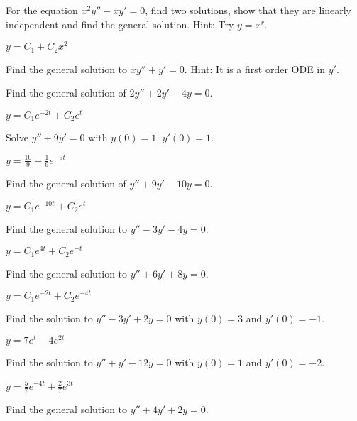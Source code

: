 \begin{exercise}
For the equation $x^2 y'' - x y' = 0$, find two solutions, show that they
are linearly independent and find the general solution.
Hint: Try $y = x^r$.
\end{exercise}
\comboSol{%
}
{%
$y = C_1 + C_2x^2$
}

\begin{exercise}\ansMark%
Find the general solution to
$x y'' + y' = 0$.  Hint: It is a first order ODE in $y'$.
\end{exercise}

\begin{exercise}
Find the general solution of $2y'' + 2y' -4 y = 0$.
\end{exercise}
\comboSol{%
}
{%
$y = C_1e^{-2t} + C_2e^{t}$
}

\begin{exercise}
Solve $y'' + 9y' = 0$ with $y(0) = 1$, $y'(0) = 1$.
\end{exercise}
\comboSol{%
}
{%
$y = \frac{10}{9} - \frac{1}{9}e^{-9t}$
}
\begin{exercise}
Find the general solution of $y'' + 9y' - 10 y = 0$.
\end{exercise}
\comboSol{%
}
{%
$y = C_1e^{-10t} + C_2e^t$
}

\begin{exercise}
Find the general solution to $y'' - 3y' - 4y = 0$.
\end{exercise}
\comboSol{%
}
{%
$y = C_1e^{4t} + C_2e^{-t}$
}

\begin{exercise}
Find the general solution to $y'' + 6y' + 8y = 0$.
\end{exercise}
\comboSol{%
}
{%
$y = C_1e^{-2t} + C_2e^{-4t}$
}

\begin{exercise}
Find the solution to $y'' - 3y' + 2y = 0$ with $y(0) = 3$ and $y'(0) = -1$.
\end{exercise}
\comboSol{%
}
{%
$y = 7e^t - 4e^{2t}$
}

\begin{exercise}
Find the solution to $y'' + y' -12y = 0$ with $y(0) = 1$ and $y'(0) = -2$.
\end{exercise}
\comboSol{%
}
{%
$y = \frac{5}{7}e^{-4t} + \frac{2}{7}e^{3t}$
}
\begin{exercise}\ansMark%
Find the general solution to
$y''+4y'+2y=0$.
\end{exercise}

